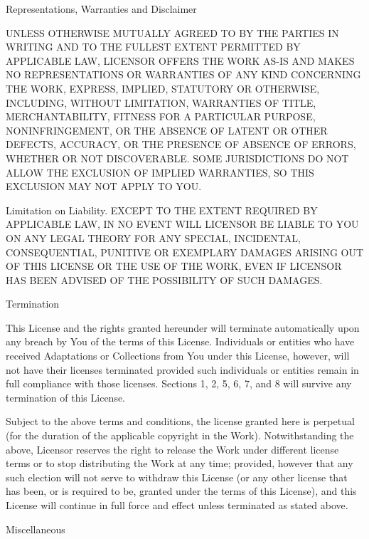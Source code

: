 \item
Representations, Warranties and Disclaimer

UNLESS OTHERWISE MUTUALLY AGREED TO BY THE PARTIES IN WRITING AND TO THE
FULLEST EXTENT PERMITTED BY APPLICABLE LAW, LICENSOR OFFERS THE WORK AS-IS
AND MAKES NO REPRESENTATIONS OR WARRANTIES OF ANY KIND CONCERNING THE
WORK, EXPRESS, IMPLIED, STATUTORY OR OTHERWISE, INCLUDING, WITHOUT
LIMITATION, WARRANTIES OF TITLE, MERCHANTABILITY, FITNESS FOR A PARTICULAR
PURPOSE, NONINFRINGEMENT, OR THE ABSENCE OF LATENT OR OTHER DEFECTS,
ACCURACY, OR THE PRESENCE OF ABSENCE OF ERRORS, WHETHER OR NOT
DISCOVERABLE. SOME JURISDICTIONS DO NOT ALLOW THE EXCLUSION OF IMPLIED
WARRANTIES, SO THIS EXCLUSION MAY NOT APPLY TO YOU.

\item
Limitation on Liability. EXCEPT TO THE EXTENT REQUIRED BY APPLICABLE
LAW, IN NO EVENT WILL LICENSOR BE LIABLE TO YOU ON ANY LEGAL THEORY FOR
ANY SPECIAL, INCIDENTAL, CONSEQUENTIAL, PUNITIVE OR EXEMPLARY DAMAGES
ARISING OUT OF THIS LICENSE OR THE USE OF THE WORK, EVEN IF LICENSOR HAS
BEEN ADVISED OF THE POSSIBILITY OF SUCH DAMAGES.

\item
Termination

    \startitemize[a]
    \item
    This License and the rights granted hereunder will terminate
    automatically upon any breach by You of the terms of this License.
    Individuals or entities who have received Adaptations or Collections
    from You under this License, however, will not have their licenses
    terminated provided such individuals or entities remain in full
    compliance with those licenses. Sections 1, 2, 5, 6, 7, and 8 will
    survive any termination of this License.
    \item
    Subject to the above terms and conditions, the license granted here is
    perpetual (for the duration of the applicable copyright in the Work).
    Notwithstanding the above, Licensor reserves the right to release the
    Work under different license terms or to stop distributing the Work at
    any time; provided, however that any such election will not serve to
    withdraw this License (or any other license that has been, or is
    required to be, granted under the terms of this License), and this
    License will continue in full force and effect unless terminated as
    stated above.
    \stopitemize

\item
Miscellaneous

